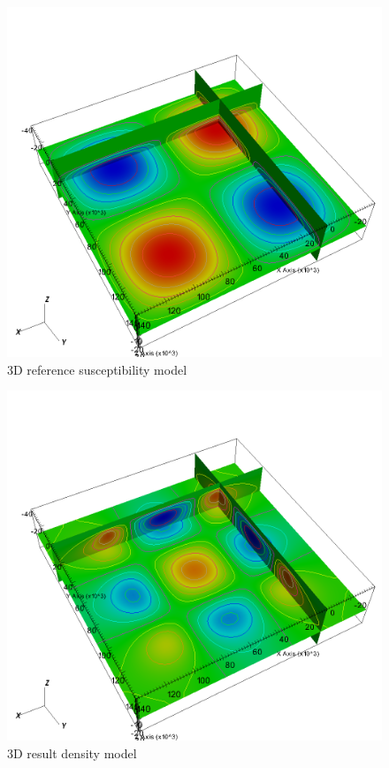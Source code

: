 \begin{figure}
\centering
\includegraphics[width=\textwidth]{joint3D4mag6grav-mref.png}
\caption{3D reference susceptibility model}
\label{fig:joint3D4mag6grav-mref}
\end{figure}


\begin{figure}
\centering
\includegraphics[width=\textwidth]{joint3D4mag6grav-g.png}
\caption{3D result density model}
\label{fig:joint3D4mag6grav-g}
\end{figure}


